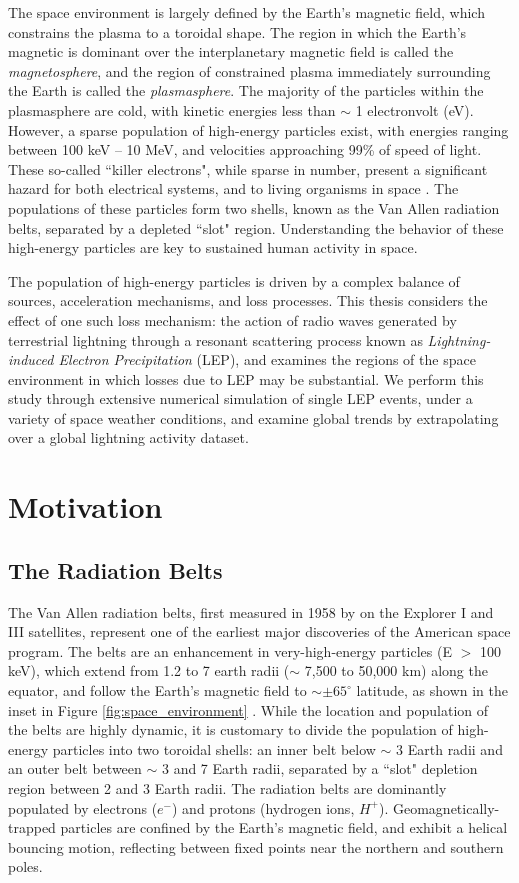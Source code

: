 The space environment is largely defined by the Earth's magnetic field, which constrains the plasma to a toroidal shape. The region in which the Earth's magnetic is dominant over the interplanetary magnetic field is called the \emph{magnetosphere}, and the region of constrained plasma immediately surrounding the Earth is called the \emph{plasmasphere}. The majority of the particles within the plasmasphere are cold, with kinetic energies less than $\sim$ 1 electronvolt (eV). However, a sparse population of high-energy particles exist, with energies ranging between 100 keV -- 10 MeV, and velocities approaching 99\% of speed of light. These so-called ``killer electrons", while sparse in number, present a significant hazard for both electrical systems, and to living organisms in space \citep{Barth2003}. The populations of these particles form two shells, known as the Van Allen radiation belts, separated by a depleted ``slot" region. Understanding the behavior of these high-energy particles are key to sustained human activity in space. 

The population of high-energy particles is driven by a complex balance of sources, acceleration mechanisms, and loss processes. This thesis considers the effect of one such loss mechanism: the action of radio waves generated by terrestrial lightning through a resonant scattering process known as \emph{Lightning-induced Electron Precipitation} (LEP), and examines the regions of the space environment in which losses due to LEP may be substantial. We perform this study through extensive numerical simulation of single LEP events, under a variety of space weather conditions, and examine global trends by extrapolating over a global lightning activity dataset.



\section{Motivation}
\subsection{The Radiation Belts}
The Van Allen radiation belts, first measured in 1958 by \cite{VanAllen1958} on the Explorer I and III satellites, represent one of the earliest major discoveries of the American space program. The belts are an enhancement in very-high-energy particles (E $>$ 100 keV), which extend from 1.2 to 7 earth radii ($\sim$ 7,500 to 50,000 km) along the equator, and follow the Earth's magnetic field to $\sim \pm65^\circ$ latitude, as shown in the inset in Figure \ref{fig:space_environment} \citep{Walt1994}. While the location and population of the belts are highly dynamic, it is customary to divide the population of high-energy particles into two toroidal shells: an inner belt below $\sim$ 3 Earth radii and an outer belt between $\sim$ 3 and 7 Earth radii, separated by a ``slot" depletion region between 2 and 3 Earth radii. The radiation belts are dominantly populated by electrons ($e^-$) and protons (hydrogen ions, $H^+$). Geomagnetically-trapped particles are confined by the Earth's magnetic field, and exhibit a helical bouncing motion, reflecting between fixed points near the northern and southern poles.

